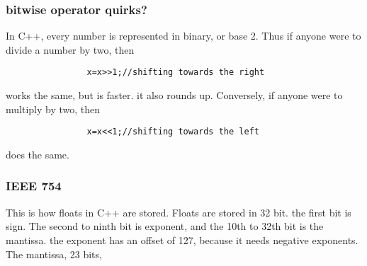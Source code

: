 \documentclass{article} %
\begin{document}
        \subsubsection{bitwise operator quirks?}
            In C++, every number is represented in binary, or base 2. Thus if anyone were to divide a number by two, then
            \begin{verbatim}
                x=x>>1;//shifting towards the right
            \end{verbatim}
            works the same, but is faster. it also rounds up. Conversely, if anyone were to multiply by two, then 
            \begin{verbatim}
                x=x<<1;//shifting towards the left
            \end{verbatim}
            does the same.
        \subsubsection{IEEE 754}
            This is how floats in C++ are stored. Floats are stored in 32 bit. the first bit is sign.
            The second to ninth bit is exponent, and the 10th to 32th bit is the mantissa. the exponent has
            an offset of 127, because it needs negative exponents. The mantissa, 23 bits, 
\end{document}
